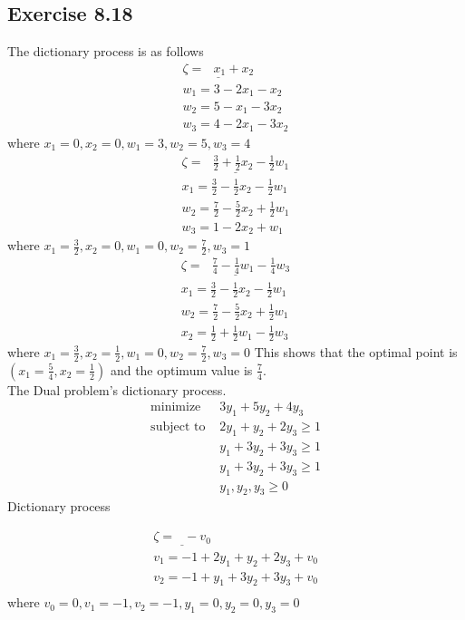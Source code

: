 \documentclass[11.5pt, letterpaper, bibtotoc,
    tablecaptionabove, figurecaptionabove]{article}
\begin{document}
 \subsection*{Exercise 8.18}
 The dictionary process is as follows
\begin{align*}
	\underline{\zeta = \:\:\: x_1+ x_2}\\
	w_1 = 3-2x_1 - x_2 \\
	w_2 = 5 - x_1 - 3x_2\\
	w_3 = 4 - 2x_1 - 3x_2
\end{align*}
where $x_1 = 0, x_2 = 0, w_1 = 3, w_2 = 5, w_3 = 4$
\begin{align*}
	\underline{\zeta = \:\:\: \frac{3}{2} + \frac{1}{2}x_2 - \frac{1}{2}w_1}\\
	x_1 = \frac{3}{2} - \frac{1}{2}x_2 - \frac{1}{2}w_1 \\
	w_2 = \frac{7}{2} - \frac{5}{2}x_2  + \frac{1}{2}w_1\\
	w_3 = 1 - 2x_2 + w_1
\end{align*}
where $x_1 = \frac{3}{2}, x_2 = 0, w_1 = 0, w_2 = \frac{7}{2}, w_3 = 1$
\begin{align*}
	\underline{\zeta = \:\:\: \frac{7}{4} - \frac{1}{4}w_1 - \frac{1}{4}w_3}\\ 
	x_1 = \frac{3}{2} - \frac{1}{2}x_2 - \frac{1}{2}w_1 \\
	w_2 = \frac{7}{2} - \frac{5}{2}x_2  + \frac{1}{2}w_1\\
	x_2 = \frac{1}{2} + \frac{1}{2}w_1 - \frac{1}{2}w_3
\end{align*}
where $x_1 = \frac{3}{2}, x_2 = \frac{1}{2}, w_1 = 0, w_2 = \frac{7}{2}, w_3 = 0$
This shows that the optimal point is $(x_1=\frac{5}{4}, x_2=\frac{1}{2})$ and the optimum value is $\frac{7}{4}$. \\

The Dual problem's dictionary process.
\begin{align*}
	\text{minimize  } &3y_1 + 5y_2 + 4y_3\\
	\text{subject to } &2y_1 + y_2 + 2y_3 \geq 1 \\
	& y_1 + 3y_2 +3y_3 \geq 1\\
	& y_1 + 3y_2 +3y_3 \geq 1 \\
	&y_1, y_2, y_3 \geq 0
\end{align*}
Dictionary process

\begin{align*}
	\underline{\zeta = \:\:\: - v_0}\\
	v_1 = -1 +2y_1 +y_2 + 2y_3 + v_0\\
	v_2 = -1 + y_1 + 3y_2 + 3y_3 +v_0\\
\end{align*}
where $v_0 = 0, v_1 = -1, v_2=-1, y_1=0, y_2=0, y_3=0$
\end{document}
